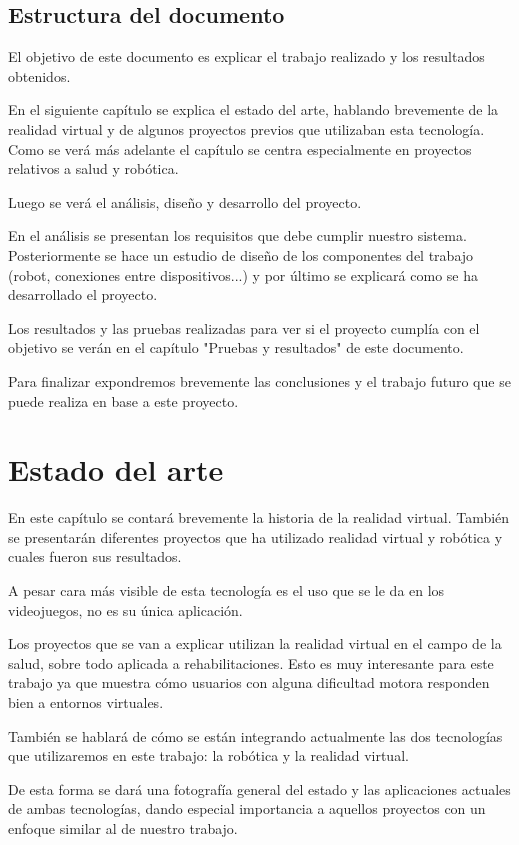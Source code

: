 \documentclass[twoside, 11pt]{epstfg}
\begin{document}
\section{Estructura del documento}


El objetivo de este documento es explicar el trabajo realizado y los resultados obtenidos.

En el siguiente capítulo se explica el estado del arte, hablando brevemente de la realidad virtual y de algunos proyectos previos que utilizaban esta tecnología. Como se verá más adelante el capítulo se centra especialmente en proyectos relativos a salud y robótica.

Luego se verá el análisis, diseño y desarrollo del proyecto.

En el análisis se presentan los requisitos que debe cumplir nuestro sistema. Posteriormente se hace un estudio de diseño de los componentes del trabajo (robot, conexiones entre dispositivos...) y por último se explicará como se ha desarrollado el proyecto.

Los resultados y las pruebas realizadas para ver si el proyecto cumplía con el objetivo se verán en el capítulo "Pruebas y resultados" de este documento.

Para finalizar expondremos brevemente las conclusiones y el trabajo futuro que se puede realiza en base a este proyecto.

\chapter{Estado del arte}


En este capítulo se contará brevemente la historia de la realidad virtual.
También se presentarán diferentes proyectos que ha utilizado realidad virtual y robótica y cuales fueron sus resultados.

A pesar cara más visible de esta tecnología es el uso que se le da en los videojuegos, no es su única aplicación.

Los proyectos que se van a explicar utilizan la realidad virtual en el campo de la salud, sobre todo aplicada a rehabilitaciones. Esto es muy interesante para este trabajo ya que muestra cómo usuarios con alguna dificultad motora responden bien a entornos virtuales.

También se hablará de cómo se están integrando actualmente  las dos tecnologías que utilizaremos en este trabajo: la robótica y la realidad virtual.

De esta forma se dará una fotografía general del estado y las aplicaciones actuales de ambas tecnologías, dando especial importancia a aquellos proyectos con un enfoque similar al de nuestro trabajo.
\end{document}
